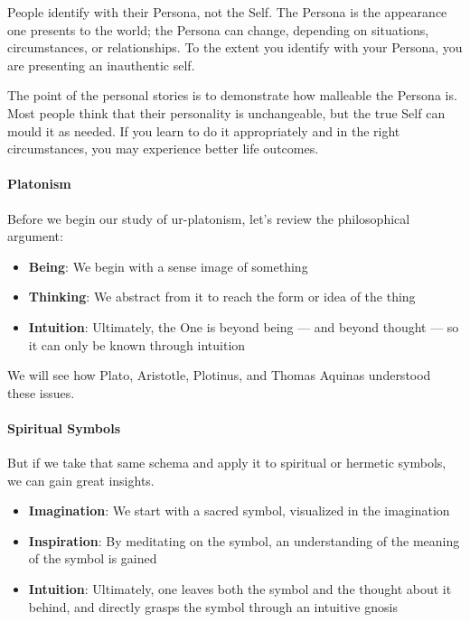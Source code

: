 People identify with their Persona, not the Self. The Persona is the appearance one presents to the world; the Persona can change, depending on situations, circumstances, or relationships. To the extent you identify with your Persona, you are presenting an inauthentic self.

The point of the personal stories is to demonstrate how malleable the Persona is. Most people think that their personality is unchangeable, but the true Self can mould it as needed. If you learn to do it appropriately and in the right circumstances, you may experience better life outcomes.

\paragraph{Platonism}


Before we begin our study of ur-platonism, let's review the philosophical argument:

\begin{itemize}


\item \textbf{Being}: We begin with a sense image of something


\item \textbf{Thinking}: We abstract from it to reach the form or idea of the thing

\item \textbf{Intuition}: Ultimately, the One is beyond being --- and beyond thought --- so it can only be known through intuition
\end{itemize}


We will see how Plato, Aristotle, Plotinus, and Thomas Aquinas understood these issues.

\paragraph{Spiritual Symbols}


But if we take that same schema and apply it to spiritual or hermetic symbols, we can gain great insights.

\begin{itemize}


\item \textbf{Imagination}: We start with a sacred symbol, visualized in the imagination

\item \textbf{Inspiration}: By meditating on the symbol, an understanding of the meaning of the symbol is gained

\item \textbf{Intuition}: Ultimately, one leaves both the symbol and the thought about it behind, and directly grasps the symbol through an intuitive gnosis
\end{itemize}


